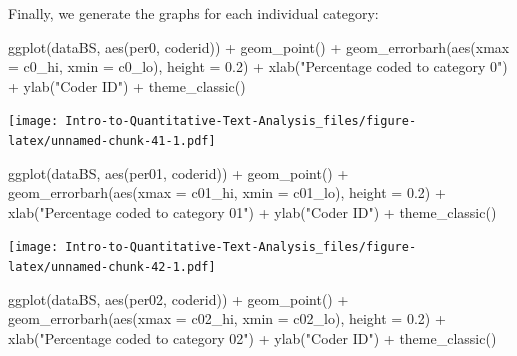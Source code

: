 \documentclass[
]{article}
\newenvironment{Shaded}{\begin{snugshade}}{\end{snugshade}}
\newcommand{\AttributeTok}[1]{\textcolor[rgb]{0.77,0.63,0.00}{#1}}
\newcommand{\FloatTok}[1]{\textcolor[rgb]{0.00,0.00,0.81}{#1}}
\newcommand{\FunctionTok}[1]{\textcolor[rgb]{0.00,0.00,0.00}{#1}}
\newcommand{\NormalTok}[1]{#1}
\newcommand{\SpecialCharTok}[1]{\textcolor[rgb]{0.00,0.00,0.00}{#1}}
\newcommand{\StringTok}[1]{\textcolor[rgb]{0.31,0.60,0.02}{#1}}
\begin{document}
Finally, we generate the graphs for each individual category:

\begin{Shaded}
\begin{Highlighting}[]
\FunctionTok{ggplot}\NormalTok{(dataBS, }\FunctionTok{aes}\NormalTok{(per0, coderid)) }\SpecialCharTok{+} \FunctionTok{geom\_point}\NormalTok{() }\SpecialCharTok{+} \FunctionTok{geom\_errorbarh}\NormalTok{(}\FunctionTok{aes}\NormalTok{(}\AttributeTok{xmax =}\NormalTok{ c0\_hi,}
    \AttributeTok{xmin =}\NormalTok{ c0\_lo), }\AttributeTok{height =} \FloatTok{0.2}\NormalTok{) }\SpecialCharTok{+} \FunctionTok{xlab}\NormalTok{(}\StringTok{"Percentage coded to category 0"}\NormalTok{) }\SpecialCharTok{+}
    \FunctionTok{ylab}\NormalTok{(}\StringTok{"Coder ID"}\NormalTok{) }\SpecialCharTok{+} \FunctionTok{theme\_classic}\NormalTok{()}
\end{Highlighting}
\end{Shaded}

\texttt{[image: Intro-to-Quantitative-Text-Analysis\_files/figure-latex/unnamed-chunk-41-1.pdf]}

\begin{Shaded}
\begin{Highlighting}[]
\FunctionTok{ggplot}\NormalTok{(dataBS, }\FunctionTok{aes}\NormalTok{(per01, coderid)) }\SpecialCharTok{+} \FunctionTok{geom\_point}\NormalTok{() }\SpecialCharTok{+} \FunctionTok{geom\_errorbarh}\NormalTok{(}\FunctionTok{aes}\NormalTok{(}\AttributeTok{xmax =}\NormalTok{ c01\_hi,}
    \AttributeTok{xmin =}\NormalTok{ c01\_lo), }\AttributeTok{height =} \FloatTok{0.2}\NormalTok{) }\SpecialCharTok{+} \FunctionTok{xlab}\NormalTok{(}\StringTok{"Percentage coded to category 01"}\NormalTok{) }\SpecialCharTok{+}
    \FunctionTok{ylab}\NormalTok{(}\StringTok{"Coder ID"}\NormalTok{) }\SpecialCharTok{+} \FunctionTok{theme\_classic}\NormalTok{()}
\end{Highlighting}
\end{Shaded}

\texttt{[image: Intro-to-Quantitative-Text-Analysis\_files/figure-latex/unnamed-chunk-42-1.pdf]}

\begin{Shaded}
\begin{Highlighting}[]
\FunctionTok{ggplot}\NormalTok{(dataBS, }\FunctionTok{aes}\NormalTok{(per02, coderid)) }\SpecialCharTok{+} \FunctionTok{geom\_point}\NormalTok{() }\SpecialCharTok{+} \FunctionTok{geom\_errorbarh}\NormalTok{(}\FunctionTok{aes}\NormalTok{(}\AttributeTok{xmax =}\NormalTok{ c02\_hi,}
    \AttributeTok{xmin =}\NormalTok{ c02\_lo), }\AttributeTok{height =} \FloatTok{0.2}\NormalTok{) }\SpecialCharTok{+} \FunctionTok{xlab}\NormalTok{(}\StringTok{"Percentage coded to category 02"}\NormalTok{) }\SpecialCharTok{+}
    \FunctionTok{ylab}\NormalTok{(}\StringTok{"Coder ID"}\NormalTok{) }\SpecialCharTok{+} \FunctionTok{theme\_classic}\NormalTok{()}
\end{Highlighting}
\end{Shaded}
\end{document}
